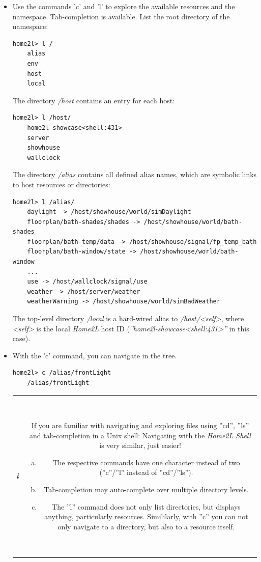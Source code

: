 \documentclass[12pt,english,parskip=half,headheight=19pt]{scrreprt}
\newcommand{\infobox}[1]{
  \par
  \medskip
  \hfill
  \setlength\arrayrulewidth{1pt}
  \begin{tabular}[t]{c|c|}
    \parbox{1.8em}{\hfill\textit{\Huge\textbf{i}\,}}
    &
    \,\parbox{0.89\linewidth}{\setlength{\parskip}{0.5em} \small #1}\,
  \end{tabular}
  \medskip
  \par
}
\begin{document}
\begin{itemize}[$\blacktriangleright$]
\item
  Use the commands 'c' and 'l' to explore the available resources and the namespace.
  Tab-completion is available.
  List the root directory of the namespace:
  \begin{lstlisting}[language=home2l]
    home2l> l /
    alias
    env
    host
    local
  \end{lstlisting}

  The directory \textit{/host} contains an entry for each host:
  \begin{lstlisting}[language=home2l]
    home2l> l /host/
    home2l-showcase<shell:431>
    server
    showhouse
    wallclock
  \end{lstlisting}

  The directory \textit{/alias} contains all defined alias names, which are symbolic
  links to host resources or directories:
  \begin{lstlisting}[language=home2l]
    home2l> l /alias/
    daylight -> /host/showhouse/world/simDaylight
    floorplan/bath-shades/shades -> /host/showhouse/world/bath-shades
    floorplan/bath-temp/data -> /host/showhouse/signal/fp_temp_bath
    floorplan/bath-window/state -> /host/showhouse/world/bath-window
    ...
    use -> /host/wallclock/signal/use
    weather -> /host/server/weather
    weatherWarning -> /host/showhouse/world/simBadWeather
  \end{lstlisting}

  The top-level directory \textit{/local} is a hard-wired alias to
  \textit{/host/<self>}, where \textit{<self>} is the local
  \textit{Home2L} host ID (\textit{''home2l-showcase<shell:431>''} in this case).

\item
  With the 'c' command, you can navigate in the tree.
  \begin{lstlisting}[language=home2l]
    home2l> c /alias/frontLight
    /alias/frontLight
  \end{lstlisting}

  \infobox{
    If you are familiar with navigating and exploring files using ''cd'', ''ls'' and
    tab-completion in a Unix shell: Navigating with the \textit{Home2L Shell} is very
    similar, just easier!
    \begin{enumerate}[a)]
      \item The respective commands have one character instead of two (''c''/''l'' instead of ''cd''/''ls'').
      \item Tab-completion may auto-complete over multiple directory levels.
      \item The ''l'' command does not only list directories, but displays anything, particularly resources.
        Simililarly, with ''c'' you can not only navigate to a directory, but also to a resource itself.
    \end{enumerate}
  }


\end{itemize}
\end{document}

